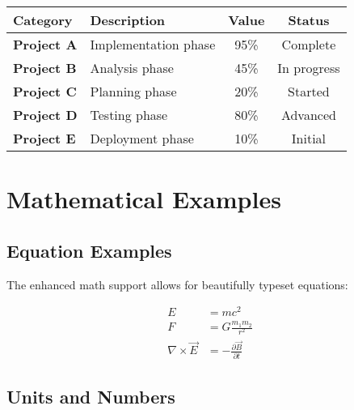 \documentclass[a4paper,11pt,xetex]{article}
\begin{document}
\begin{tcolorbox}[colback=cardbg, colframe=frameborder, coltitle=white,
    fonttitle=\bfseries, title=📊 Data Analysis Results,
    enhanced, boxrule=0.5pt, arc=4pt, left=10pt, right=10pt, top=8pt, bottom=8pt,
    attach boxed title to top left={xshift=10pt, yshift=-2mm},
    boxed title style={colback=accent, arc=2pt}
]


\begin{tabularx}{\linewidth}{>{\raggedright\arraybackslash\bfseries}X >{\raggedright\arraybackslash}X c c}
    \rowcolor{headerbg}
    \textcolor{headertext}{Category} &
    \textcolor{headertext}{Description} &
    \textcolor{headertext}{Value} &
    \textcolor{headertext}{Status} \\
    \toprule
    Project A & Implementation phase & 95\% & Complete  \\
    Project B & Analysis phase & 45\% & In progress \\
    Project C & Planning phase & 20\% & Started \\
    Project D & Testing phase & 80\% & Advanced \\
    Project E & Deployment phase & 10\% & Initial \\
    \bottomrule
\end{tabularx}

\end{tcolorbox}

\section{Mathematical Examples}
\label{sec:math}

\subsection{Equation Examples}

The enhanced math support allows for beautifully typeset equations:

\begin{align}
E &= mc^2 \\
F &= G\frac{m_1 m_2}{r^2} \\
\nabla \times \vec{E} &= -\frac{\partial \vec{B}}{\partial t}
\end{align}

\subsection{Units and Numbers}
\end{document}
